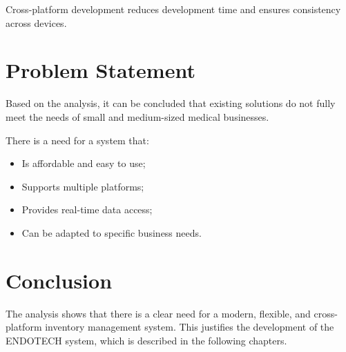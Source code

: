Cross-platform development reduces development time and ensures consistency across devices.

\section{Problem Statement}

Based on the analysis, it can be concluded that existing solutions do not fully meet the needs of small and medium-sized medical businesses.

There is a need for a system that:
\begin{itemize}
    \item Is affordable and easy to use;
    \item Supports multiple platforms;
    \item Provides real-time data access;
    \item Can be adapted to specific business needs.
\end{itemize}

\section{Conclusion}

The analysis shows that there is a clear need for a modern, flexible, and cross-platform inventory management system. This justifies the development of the ENDOTECH system, which is described in the following chapters.